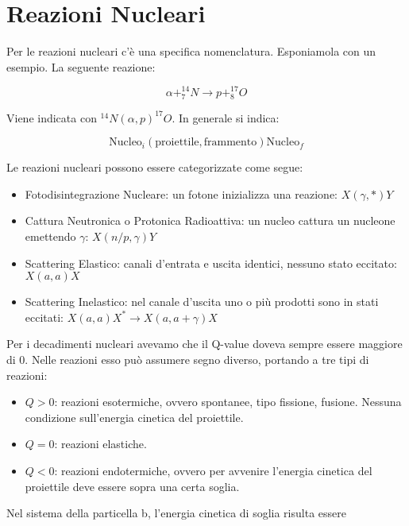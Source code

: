 
\chapter{Reazioni Nucleari}

Per le reazioni nucleari c'è una specifica nomenclatura. Esponiamola con un esempio. La seguente reazione:

\begin{equation}
\alpha+^{14}_7N \longrightarrow p+^{17}_8O
\end{equation}

Viene indicata con $^{14}N(\alpha,p)^{17}O$. In generale si indica:

\begin{equation}
\text{Nucleo}_i(\text{proiettile},\text{frammento})\text{Nucleo}_f
\end{equation}

Le reazioni nucleari possono essere categorizzate come segue:

\begin{itemize}
\item Fotodisintegrazione Nucleare: un fotone inizializza una reazione: $X(\gamma,*)Y$
\item Cattura Neutronica o Protonica Radioattiva: un nucleo cattura un nucleone emettendo $\gamma$: $X(n/p,\gamma)Y$
\item Scattering Elastico: canali d'entrata e uscita identici, nessuno stato eccitato: $X(a,a)X$
\item Scattering Inelastico: nel canale d'uscita uno o più prodotti sono in stati eccitati: $X(a,a)X^* \rightarrow X(a,a+\gamma)X$
\end{itemize}

Per i decadimenti nucleari avevamo che il Q-value doveva sempre essere maggiore di 0. Nelle reazioni esso può assumere segno diverso, portando a tre tipi di reazioni:

\begin{itemize}
\item $Q>0$: reazioni esotermiche, ovvero spontanee, tipo fissione, fusione. Nessuna condizione sull'energia cinetica del proiettile.
\item $Q=0$: reazioni elastiche.
\item $Q<0$: reazioni endotermiche, ovvero per avvenire l'energia cinetica del proiettile deve essere sopra una certa soglia.
\end{itemize}

Nel sistema della particella b, l'energia cinetica di soglia risulta essere

